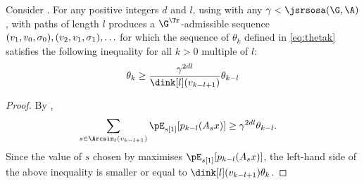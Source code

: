 \begin{lemma}
  \label{lem:maxdegpathl}
  Consider .
  For any positive integers $d$ and $l$,
    using  with any $\gamma < \jsrsosa\\(\G,\A)$,
   with paths of length $l$
  produces a $\G^\Tr$-admissible sequence
  $(v_1,v_0,\\\sigma_0),(v_2,v_1,\sigma_1), \ldots$ %
  for which the sequence of $\theta_k$ defined in \eqref{eq:thetak}
  satisfies the following inequality for all $k > 0$ multiple of $l$:
  \begin{equation*}
    \theta_{k}
    \geq \frac{\gamma^{2dl}}{\dink[l](v_{k-l+1})}
    \theta_{k-l}
  \end{equation*}
  \begin{proof}
    By ,
    \begin{align*}
      \sum_{s \in \Arcsin_l(v_{k-l+1})} \pE_{s[1]}[p_{k-l}(A_s x)]
      & \geq \gamma^{2dl} \theta_{k-l}.
    \end{align*}
    Since the value of $s$ chosen by  maximises $\pE_{s[1]}[p_{k-l}(A_s x)]$,
    the left-hand side of the above inequality is smaller or equal to $\dink[l](v_{k-l+1})\theta_k$.
  \end{proof}
\end{lemma}

